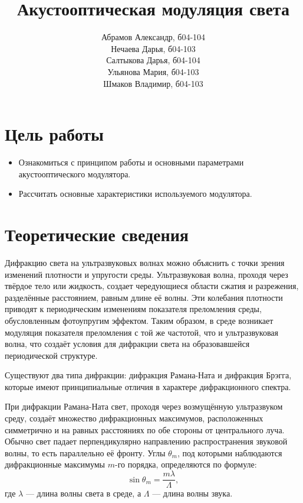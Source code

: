 \documentclass[a4paper, 12pt]{extarticle}
\title{\textcolor{main_title}{\textbf{Акустооптическая модуляция света}}}
\author{%
    \textcolor{author1}{Абрамов Александр, б04-104} \\
    \textcolor{author2}{Нечаева Дарья, б04-103}\\
    \textcolor{author3}{Салтыкова Дарья, б04-104} \\
    \textcolor{author4}{Ульянова Мария, б04-103} \\
    \textcolor{author5}{Шмаков Владимир, б04-103}%
}
\begin{document}
\maketitle



\section*{\textcolor{header}{Цель работы}}

\begin{itemize}
    \item Ознакомиться с принципом работы и основными параметрами акустооптического модулятора.
    \item Рассчитать основные характеристики используемого модулятора.
\end{itemize}

\section*{\textcolor{header}{Теоретические сведения}}



Дифракцию света на ультразвуковых волнах можно объяснить с точки зрения изменений плотности и упругости среды. Ультразвуковая волна, проходя через твёрдое тело или жидкость, создает чередующиеся области сжатия и разрежения, разделённые расстоянием, равным длине её волны. Эти колебания плотности приводят к периодическим изменениям показателя преломления среды, обусловленным фотоупругим эффектом. Таким образом, в среде возникает модуляция показателя преломления с той же частотой, что и ультразвуковая волна, что создаёт условия для дифракции света на образовавшейся периодической структуре.

Существуют два типа дифракции: дифракция Рамана-Ната и дифракция Брэгга, которые имеют принципиальные отличия в характере дифракционного спектра.


При дифракции Рамана-Ната свет, проходя через возмущённую ультразвуком среду, создаёт множество дифракционных максимумов, расположенных симметрично и на равных расстояниях по обе стороны от центрального луча. Обычно свет падает перпендикулярно направлению распространения звуковой волны, то есть параллельно её фронту. Углы $\theta_m$, под которыми наблюдаются дифракционные максимумы $m$-го порядка, определяются по формуле:
\begin{equation}
    \sin \theta_m = \frac{m \lambda}{\Lambda},
\end{equation}
где $\lambda$ — длина волны света в среде, а $\Lambda$ — длина волны звука.
\end{document}
